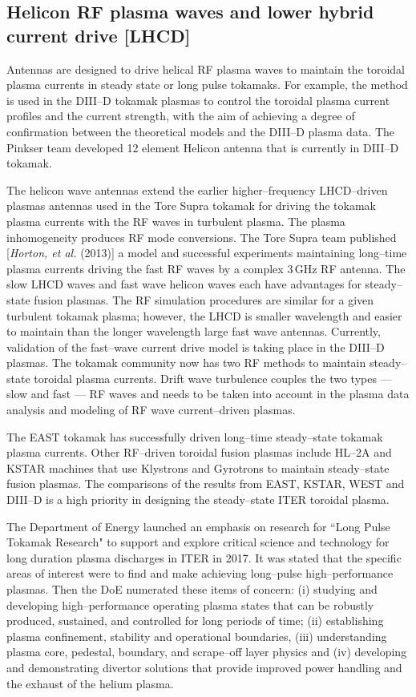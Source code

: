 \documentclass[a4paper,openany,12pt]{report}
\begin{document}
\subsection*{Helicon RF plasma waves and lower hybrid current drive [LHCD]}

Antennas are designed to drive helical RF plasma waves to maintain the toroidal plasma currents in steady state or long pulse tokamaks. For example, the method is used in the DIII--D tokamak plasmas to control the toroidal plasma current profiles and the current strength, with the aim of achieving a degree of confirmation between the theoretical models and the DIII--D plasma data. The Pinkser team developed 12 element Helicon antenna that is currently in DIII--D tokamak. 

The helicon wave antennas extend the earlier higher--frequency LHCD--driven plasmas antennas used in the Tore Supra tokamak for driving the tokamak plasma currents with the RF waves in turbulent plasma. The plasma inhomogeneity produces RF mode conversions. The Tore Supra team published [\emph{Horton, et al.} (2013)] a model and successful experiments maintaining long--time plasma currents driving the fast RF waves by a complex $3\,$GHz RF antenna. The slow LHCD waves and fast wave helicon waves each have advantages for steady--state fusion plasmas. The RF simulation procedures are similar for a given turbulent tokamak plasma; however, the LHCD is smaller wavelength and easier to maintain than the longer wavelength large fast wave antennas. Currently, validation of the fast--wave current drive model is taking place in the DIII--D plasmas. The tokamak community now has two RF methods to maintain steady--state toroidal plasma currents. Drift wave turbulence couples the two types --- slow and fast --- RF waves and needs to be taken into account in the plasma data analysis and modeling of RF wave current--driven plasmas.\\


The EAST tokamak has successfully driven long--time steady--state tokamak plasma currents. Other RF--driven toroidal fusion plasmas include HL--2A and KSTAR machines that use Klystrons and Gyrotrons to maintain steady--state fusion plasmas. The comparisons of the results from EAST, KSTAR, WEST and DIII--D is a high priority in designing the steady--state ITER toroidal plasma. 

The Department of Energy launched an emphasis on research for ``Long Pulse Tokamak Research" to support and explore critical science and technology for long duration plasma discharges in ITER in 2017. It was stated that the specific areas of interest were to find and make achieving long--pulse high--performance plasmas. Then the DoE numerated these items of concern: (i) studying and developing high--performance operating plasma states that can be robustly produced, sustained, and controlled for long periods of time; (ii) establishing plasma confinement, stability and operational boundaries, (iii) understanding plasma core, pedestal, boundary, and scrape--off layer physics and (iv) developing and demonstrating divertor solutions that provide improved power handling and the exhaust of the helium plasma.
\end{document}
